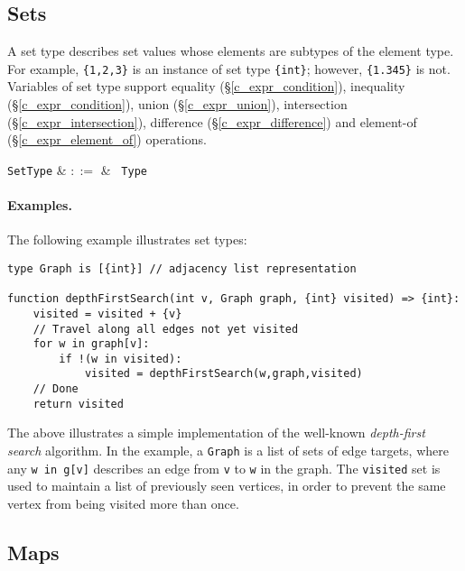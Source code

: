 \subsection{Sets}
\label{c_types_set}

A set type describes set values whose elements are subtypes of the element type. For example, \lstinline|{1,2,3}| is an instance of set type \lstinline|{int}|; however, \lstinline|{1.345}| is not.  Variables of set type support equality (\S\ref{c_expr_condition}), inequality (\S\ref{c_expr_condition}), union (\S\ref{c_expr_union}), intersection (\S\ref{c_expr_intersection}), difference (\S\ref{c_expr_difference}) and element-of (\S\ref{c_expr_element_of}) operations.

\begin{syntax}
  \verb+SetType+ & $::=$ & \token{\{} \ \verb+Type+ \ \token{\}} \\
\end{syntax}

\paragraph{Examples.}  The following example illustrates set types:

\begin{lstlisting}
type Graph is [{int}] // adjacency list representation

function depthFirstSearch(int v, Graph graph, {int} visited) => {int}:
    visited = visited + {v}
    // Travel along all edges not yet visited
    for w in graph[v]:
        if !(w in visited):
            visited = depthFirstSearch(w,graph,visited)
    // Done
    return visited
\end{lstlisting}

The above illustrates a simple implementation of the well-known {\em depth-first search} algorithm.  In the example, a \lstinline{Graph} is a list of sets of edge targets, where any \lstinline{w in g[v]} describes an edge from \lstinline{v} to \lstinline{w} in the graph.  The \lstinline{visited} set is used to maintain a list of previously seen vertices, in order to prevent the same vertex from being visited more than once.  


\subsection{Maps}
\label{c_types_map}

